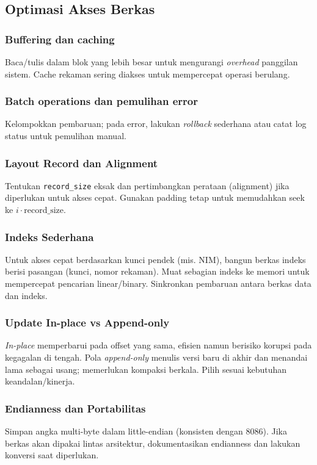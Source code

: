 \subsection{Optimasi Akses Berkas}
\subsubsection{Buffering dan caching}
Baca/tulis dalam blok yang lebih besar untuk mengurangi \textit{overhead} panggilan sistem. Cache rekaman sering diakses untuk mempercepat operasi berulang.

\subsubsection{Batch operations dan pemulihan error}
Kelompokkan pembaruan; pada error, lakukan \textit{rollback} sederhana atau catat log status untuk pemulihan manual.

\subsubsection{Layout Record dan Alignment}
Tentukan \texttt{record\_size} eksak dan pertimbangkan perataan (alignment) jika diperlukan untuk akses cepat. Gunakan padding tetap untuk memudahkan seek ke \(i\cdot \text{record\_size}\). 
\subsubsection{Indeks Sederhana}
Untuk akses cepat berdasarkan kunci pendek (mis. NIM), bangun berkas indeks berisi pasangan (kunci, nomor rekaman). Muat sebagian indeks ke memori untuk mempercepat pencarian linear/binary. Sinkronkan pembaruan antara berkas data dan indeks. 
\subsubsection{Update In-place vs Append-only}
\textit{In-place} memperbarui pada offset yang sama, efisien namun berisiko korupsi pada kegagalan di tengah. Pola \textit{append-only} menulis versi baru di akhir dan menandai lama sebagai usang; memerlukan kompaksi berkala. Pilih sesuai kebutuhan keandalan/kinerja. 
\subsubsection{Endianness dan Portabilitas}
Simpan angka multi-byte dalam little-endian (konsisten dengan 8086). Jika berkas akan dipakai lintas arsitektur, dokumentasikan endianness dan lakukan konversi saat diperlukan. 
